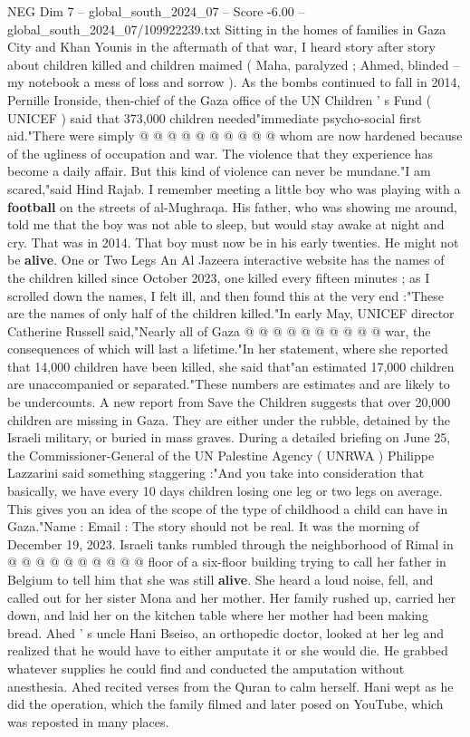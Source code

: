 \begin{textsample}{NEG Dim 7 – global\_south\_2024\_07 – Score -6.00 – global\_south\_2024\_07/109922239.txt}
Sitting in the homes of families in Gaza City and Khan Younis in the aftermath of that war, I heard story after story about children killed and children maimed ( Maha, paralyzed ; Ahmed, blinded -- my notebook a mess of loss and sorrow ).
As the bombs continued to fall in 2014, Pernille Ironside, then-chief of the Gaza office of the UN Children ' s Fund ( UNICEF ) said that 373,000 children needed"immediate psycho-social first aid."There were simply @ @ @ @ @ @ @ @ @ @ whom are now hardened because of the ugliness of occupation and war.
The violence that they experience has become a daily affair.
But this kind of violence can never be mundane."I am scared,"said Hind Rajab.
I remember meeting a little boy who was playing with a \textbf{football} on the streets of al-Mughraqa.
His father, who was showing me around, told me that the boy was not able to sleep, but would stay awake at night and cry.
That was in 2014.
That boy must now be in his early twenties.
He might not be \textbf{alive}.
One or Two Legs An Al Jazeera interactive website has the names of the children killed since October 2023, one killed every fifteen minutes ; as I scrolled down the names, I felt ill, and then found this at the very end :"These are the names of only half of the children killed."In early May, UNICEF director Catherine Russell said,"Nearly all of Gaza @ @ @ @ @ @ @ @ @ @ war, the consequences of which will last a lifetime."In her statement, where she reported that 14,000 children have been killed, she said that"an estimated 17,000 children are unaccompanied or separated."These numbers are estimates and are likely to be undercounts.
A new report from Save the Children suggests that over 20,000 children are missing in Gaza.
They are either under the rubble, detained by the Israeli military, or buried in mass graves.
During a detailed briefing on June 25, the Commissioner-General of the UN Palestine Agency ( UNRWA ) Philippe Lazzarini said something staggering :"And you take into consideration that basically, we have every 10 days children losing one leg or two legs on average.
This gives you an idea of the scope of the type of childhood a child can have in Gaza."Name : Email : The story should not be real.
It was the morning of December 19, 2023.
Israeli tanks rumbled through the neighborhood of Rimal in @ @ @ @ @ @ @ @ @ @ floor of a six-floor building trying to call her father in Belgium to tell him that she was still \textbf{alive}.
She heard a loud noise, fell, and called out for her sister Mona and her mother.
Her family rushed up, carried her down, and laid her on the kitchen table where her mother had been making bread.
Ahed ' s uncle Hani Bseiso, an orthopedic doctor, looked at her leg and realized that he would have to either amputate it or she would die.
He grabbed whatever supplies he could find and conducted the amputation without anesthesia.
Ahed recited verses from the Quran to calm herself.
Hani wept as he did the operation, which the family filmed and later posed on YouTube, which was reposted in many places.

\end{textsample}
